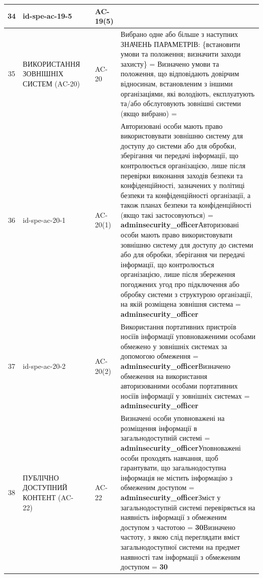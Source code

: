 \documentclass[10pt]{article}
\begin{document}
\begin{longtable}{|c|>{\raggedright\arraybackslash}p{2.5cm}|>{\raggedright\arraybackslash}p{4.5cm}|>{\raggedright\arraybackslash}p{3cm}|>{\raggedright\arraybackslash}p{4.5cm}|}
34 & id-spe-ac-19-5 &  & AC-19(5) &  \\ \hline
35 & ВИКОРИСТАННЯ ЗОВНІШНІХ СИСТЕМ (AC-20) &  & AC-20 & Вибрано одне або більше з наступних ЗНАЧЕНЬ ПАРАМЕТРІВ: \{встановити умови та положення; визначити заходи захисту\} = \textbf{}\newline Визначено умови та положення, що відповідають довірчим відносинам, встановленим з іншими організаціями, які володіють, експлуатують та/або обслуговують зовнішні системи (якщо вибрано) = \textbf{} \\ \hline
36 & id-spe-ac-20-1 &  & AC-20(1) & Авторизовані особи мають право використовувати зовнішню систему для доступу до системи або для обробки, зберігання чи передачі інформації, що контролюється організацією, лише після перевірки виконання заходів безпеки та конфіденційності, зазначених у політиці безпеки та конфіденційності організації, а також планах безпеки та конфіденційності (якщо такі застосовуються) = \textbf{adminsecurity\_\allowbreak{}officer}\newline Авторизовані особи мають право використовувати зовнішню систему для доступу до системи або для обробки, зберігання чи передачі інформації, що контролюється організацією, лише після збереження погоджених угод про підключення або обробку системи з структурою організації, на якій розміщена зовнішня система = \textbf{adminsecurity\_\allowbreak{}officer} \\ \hline
37 & id-spe-ac-20-2 &  & AC-20(2) & Використання портативних пристроїв носіїв інформації уповноваженими особами обмежено у зовнішніх системах за допомогою обмеження  = \textbf{adminsecurity\_\allowbreak{}officer}\newline Визначено обмеження на використання авторизованими особами портативних носіїв інформації у зовнішніх системах = \textbf{adminsecurity\_\allowbreak{}officer} \\ \hline
38 & ПУБЛІЧНО ДОСТУПНИЙ КОНТЕНТ (AC-22) &  & AC-22 & Визначені особи уповноважені на розміщення інформації в загальнодоступній системі = \textbf{adminsecurity\_\allowbreak{}officer}\newline Уповноважені особи проходять навчання, щоб гарантувати, що загальнодоступна інформація не містить інформацію з обмеженим доступом = \textbf{adminsecurity\_\allowbreak{}officer}\newline Зміст у загальнодоступній системі перевіряється на наявність інформації з обмеженим доступом з частотою = \textbf{30}\newline Визначено частоту, з якою слід переглядати вміст загальнодоступної системи на предмет наявності там інформації з обмеженим доступом = \textbf{30} \\ \hline

\end{longtable}
\end{document}
